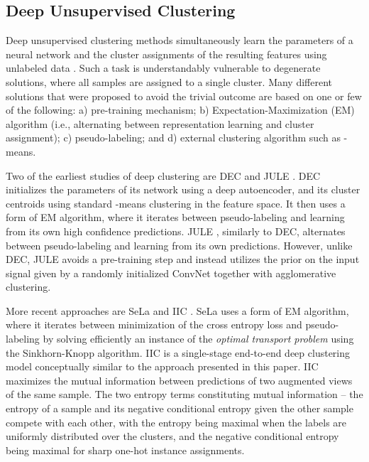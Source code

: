 \documentclass[runningheads]{llncs}
\begin{document}
\subsection{Deep Unsupervised Clustering}
\label{section:deep_unsupervised_clustering}
Deep unsupervised clustering methods simultaneously learn the parameters of a neural network and the cluster assignments of the resulting features using unlabeled data \cite{xie2016unsupervised,yang2016joint,chang2017deep,caron2018deep,haeusser2018associative,ji2019invariant,van2020scan,YM.2020Self-labelling}. Such a task is understandably vulnerable to degenerate solutions, where all samples are assigned to a single cluster. Many different solutions that were proposed to avoid the trivial outcome are based on one or few of the following: a) pre-training mechanism; b) Expectation-Maximization (EM) algorithm (i.e., alternating between representation learning and cluster assignment); c) pseudo-labeling; and d) external clustering algorithm such as -means. 

Two of the earliest studies of deep clustering are DEC \cite{xie2016unsupervised} and JULE \cite{yang2016joint}. DEC \cite{xie2016unsupervised} initializes the parameters of its network using a deep autoencoder, and its cluster centroids using standard -means clustering in the feature space. It then uses a form of EM algorithm, where it iterates between pseudo-labeling and learning from its own high confidence predictions. JULE \cite{xie2016unsupervised}, similarly to DEC, alternates between pseudo-labeling and learning from its own predictions. However, unlike DEC, JULE avoids a pre-training step and instead utilizes the prior on the input signal given by a randomly initialized ConvNet together with agglomerative clustering.

More recent approaches are SeLa \cite{YM.2020Self-labelling} and IIC \cite{ji2019invariant}. SeLa \cite{YM.2020Self-labelling} uses a form of EM algorithm, where it iterates between minimization of the cross entropy loss and pseudo-labeling by solving efficiently an instance of the {\it optimal transport problem} using the Sinkhorn-Knopp algorithm. IIC \cite{ji2019invariant} is a single-stage end-to-end deep clustering model conceptually similar to the approach presented in this paper. IIC maximizes the mutual information between predictions of two augmented views of the same sample. The two entropy terms constituting mutual information -- the entropy of a sample and its negative conditional entropy given the other sample compete with each other, with the entropy being maximal when the labels are uniformly distributed over the clusters, and the negative conditional entropy being maximal for sharp one-hot instance assignments. 
\end{document}
